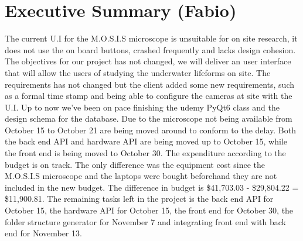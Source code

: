 \section*{Executive Summary (Fabio)}
The current U.I for the M.O.S.I.S microscope is unsuitable for on site research, it does not use the on board buttons, crashed frequently and lacks design cohesion. The objectives for our project has not changed, we will deliver an user interface that will allow the users of studying the underwater lifeforms on site. The requirements has not changed but the client added some new requirements, such as a formal time stamp and being able to configure the cameras at site with the U.I. Up to now we've been on pace finishing the udemy PyQt6  class and the design schema for the database. Due to the microscope not being available from October 15 to October 21 are being moved around to conform to the delay. Both the back end API and hardware API are being moved up to October 15, while the front end is being moved to October 30.  The expenditure according to the budget is on track. The only difference was the equipment cost since the M.O.S.I.S microscope and the laptops were bought beforehand they are not included in the new budget. The difference in budget is \$41,703.03 - \$29,804.22 = \$11,900.81. The remaining tasks left in the project is the back end API for October 15, the hardware API for October 15, the front end for October 30, the folder structure generator for November 7 and integrating front end with back end for November 13.